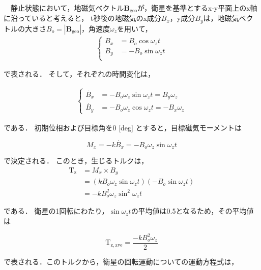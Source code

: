 　静止状態において，地磁気ベクトル$\boldsymbol{B}_\mathrm{geo}$が，衛星を基準とするx-y平面上のx軸に沿っていると考えると，
t秒後の地磁気のx成分$B_x$，y成分$B_y$は，地磁気ベクトルの大きさ$B_o=|\boldsymbol{B}_\mathrm{geo}|$，角速度$\omega_z$を用いて，
\begin{align}
    \left\{
        \begin{aligned}
            B_x &= B_o\cos\omega_zt\\
            B_y &= -B_o\sin\omega_zt\\
        \end{aligned}                    
    \right.
\end{align}

で表される．
そして，それぞれの時間変化は，

\begin{align}
    \left\{
        \begin{aligned}
            \dot{B_x} &= -B_o\omega_z\sin\omega_zt = B_y\omega_z\\
            \dot{B_y} &= -B_o\omega_z\cos\omega_zt = -B_x\omega_z
        \end{aligned}                    
    \right.
\end{align}

である．
初期位相および目標角を0 [deg] とすると，目標磁気モーメントは

\begin{equation}
    M_x = -k\dot{B_x} = -B_o\omega_z\sin\omega_zt
\end{equation}

で決定される．
このとき，生じるトルクは，
\begin{equation}
    \begin{aligned}
        \mathrm{T_z} &= M_x \times B_y\\
                     &= (kB_o\omega_z\sin\omega_zt)(-B_o\sin\omega_zt)\\
                     &= -kB_o^2\omega_z\sin^2\omega_zt
    \end{aligned}
\end{equation}

である．
衛星の1回転にわたり，$\sin\omega_zt$の平均値は0.5となるため，その平均値は

\begin{equation}
    \mathrm{T_\mathrm{z,ave}} = \frac{-kB_o^2\omega_z}{2}
\end{equation}

で表される．このトルクから，衛星の回転運動についての運動方程式は，


